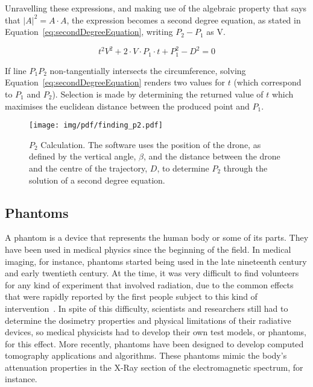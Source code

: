 Unravelling these expressions, and making use of the algebraic property
that says that $|A|^2 = A \cdot A$, the expression becomes a second
degree equation, as stated in Equation~\ref{eq:secondDegreeEquation},
writing $P_2 - P_1$ as V.

\begin{equation}
    \label{eq:secondDegreeEquation}
    t^2V^2 + 2 \cdot V \cdot P_1 \cdot t + P_{1}^2 - D^2 = 0
\end{equation}

If line $P_1P_2$ non-tangentially intersects the circumference, solving
Equation~\ref{eq:secondDegreeEquation} renders two values for $t$ (which
correspond to $P_1$ and $P_2$). Selection is made by determining the
returned value of $t$ which maximises the euclidean distance between the
produced point and $P_1$.


\begin{figure}[htb]
    \centering
    \texttt{[image: img/pdf/finding\_p2.pdf]}
    \caption{$P_2$ Calculation. The software uses the position of the
    drone, as defined by the vertical angle, $\beta$, and the distance between
    the drone and the centre of the trajectory, $D$, to determine $P_2$
    through the solution of a second degree equation.}\label{fig:p2_calculation}
\end{figure}

\subsection{Phantoms}%
\label{sub:phantoms}

A phantom is a device that represents the human body or some of its
parts. They have been used in medical physics since the beginning of the
field. In medical imaging, for instance, phantoms started being used in
the late nineteenth century and early twentieth century. At the time, it
was very difficult to find volunteers for any kind of experiment that
involved radiation, due to the common effects that were rapidly reported
by the first people subject to this kind of
intervention~\cite{Dewerd2014}. In spite of this difficulty, scientists
and researchers still had to determine the dosimetry properties and
physical limitations of their radiative devices, so medical physicists
had to develop their own test models, or phantoms, for this effect. More
recently, phantoms have been designed to develop computed tomography
applications and algorithms. These phantoms mimic the body's attenuation
properties in the X-Ray section of the electromagnetic spectrum, for
instance.

